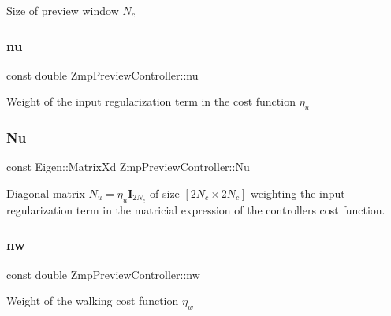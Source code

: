 Size of preview window $ N_c $ \hypertarget{classZmpPreviewController_ac611f084023404faba1ccfab573cd81d}{}\label{classZmpPreviewController_ac611f084023404faba1ccfab573cd81d} 
\subsubsection{\texorpdfstring{nu}{nu}}
{\footnotesize\ttfamily const double Zmp\+Preview\+Controller\+::nu\hspace{0.3cm}{\ttfamily [private]}}

Weight of the input regularization term in the cost function $\eta_u$ \hypertarget{classZmpPreviewController_ac3e92145988993ede7ce2060b997c8db}{}\label{classZmpPreviewController_ac3e92145988993ede7ce2060b997c8db} 
\subsubsection{\texorpdfstring{Nu}{Nu}}
{\footnotesize\ttfamily const Eigen\+::\+Matrix\+Xd Zmp\+Preview\+Controller\+::\+Nu\hspace{0.3cm}{\ttfamily [private]}}

Diagonal matrix $N_u = \eta_u\mathbf{I}_{2N_c}$ of size $[2N_c \times 2N_c]$ weighting the input regularization term in the matricial expression of the controller\textquotesingle{}s cost function. \hypertarget{classZmpPreviewController_a783427b817d77469e1f80426bede5310}{}\label{classZmpPreviewController_a783427b817d77469e1f80426bede5310} 
\subsubsection{\texorpdfstring{nw}{nw}}
{\footnotesize\ttfamily const double Zmp\+Preview\+Controller\+::nw\hspace{0.3cm}{\ttfamily [private]}}

Weight of the walking cost function $ \eta_w $ \hypertarget{classZmpPreviewController_a5e85354a1a7c3f2a8e265dbe7367051c}{}\label{classZmpPreviewController_a5e85354a1a7c3f2a8e265dbe7367051c} 
